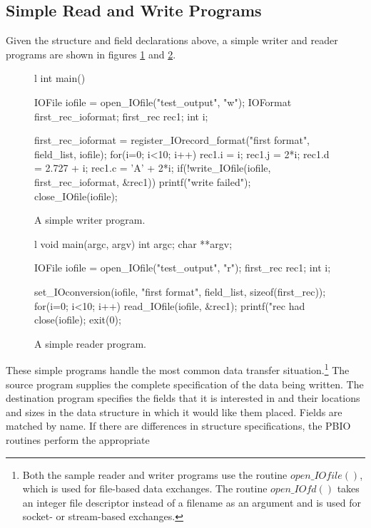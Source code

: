 \documentclass{article}
\begin{document}
\subsection{Simple Read and Write Programs\label{sec:simple}}
Given the structure and field declarations above, a simple writer and reader
programs are shown in figures \ref{writer} and \ref{reader}.
\begin{figure}[bth]
\begin{code}{l}
int main()
{
    IOFile iofile = open_IOfile("test_output", "w");
    IOFormat first_rec_ioformat;
    first_rec rec1;
    int i;

    first_rec_ioformat = register_IOrecord_format("first format",
                                                  field_list,
                                                  iofile);
    for(i=0; i<10; i++) {
        rec1.i = i;  rec1.j = 2*i; rec1.d = 2.727 + i; rec1.c = 'A' + 2*i;
        if(!write_IOfile(iofile, first_rec_ioformat, &rec1)) {
           printf("write failed\n");
        }
    }
    close_IOfile(iofile);
}
\end{code}
\caption{A simple writer program.\label{writer}}
\end{figure}
\begin{figure}[tbh]
\begin{code}{l}
void
main(argc, argv)
int argc;
char **argv;
{
    IOFile iofile = open_IOfile("test_output", "r");
    first_rec rec1;
    int i;

    set_IOconversion(iofile, "first format", field_list, sizeof(first_rec));
    for(i=0; i<10; i++) {
        read_IOfile(iofile, &rec1);
        printf("rec had %
    }
    close(iofile);
    exit(0);    
}
\end{code}
\caption{A simple reader program.\label{reader}}
\end{figure}
These simple programs handle the most common data transfer
situation.\footnote{Both the sample reader and writer programs use the routine
$open\_IOfile()$, which is used for file-based data exchanges.  The routine
$open\_IOfd()$ takes an integer file descriptor instead of a filename as an
argument and is used for socket- or stream-based exchanges.}  
The source program supplies the complete specification of the data being
written.  The destination program specifies the fields that it is interested
in and their locations and sizes in the data structure in which it would like
them placed. Fields are matched by name.  If there are differences in
structure specifications, the PBIO routines perform the appropriate
\end{document}
